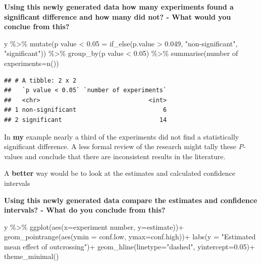 \documentclass[
]{book}
\newenvironment{Shaded}{\begin{snugshade}}{\end{snugshade}}
\newcommand{\AttributeTok}[1]{\textcolor[rgb]{0.77,0.63,0.00}{#1}}
\newcommand{\FloatTok}[1]{\textcolor[rgb]{0.00,0.00,0.81}{#1}}
\newcommand{\FunctionTok}[1]{\textcolor[rgb]{0.00,0.00,0.00}{#1}}
\newcommand{\NormalTok}[1]{#1}
\newcommand{\OtherTok}[1]{\textcolor[rgb]{0.56,0.35,0.01}{#1}}
\newcommand{\SpecialCharTok}[1]{\textcolor[rgb]{0.00,0.00,0.00}{#1}}
\newcommand{\StringTok}[1]{\textcolor[rgb]{0.31,0.60,0.02}{#1}}
\begin{document}
\textbf{Using this newly generated data how many experiments found a significant difference and how many did not? - What would you conclue from this?}

\begin{Shaded}
\begin{Highlighting}[]
\NormalTok{y }\SpecialCharTok{\%\textgreater{}\%} 
  \FunctionTok{mutate}\NormalTok{(}\StringTok{\textasciigrave{}}\AttributeTok{p value \textless{} 0.05}\StringTok{\textasciigrave{}} \OtherTok{=} \FunctionTok{if\_else}\NormalTok{(p.value }\SpecialCharTok{\textgreater{}} \FloatTok{0.049}\NormalTok{, }\StringTok{"non{-}significant"}\NormalTok{, }\StringTok{"significant"}\NormalTok{)) }\SpecialCharTok{\%\textgreater{}\%} 
  \FunctionTok{group\_by}\NormalTok{(}\StringTok{\textasciigrave{}}\AttributeTok{p value \textless{} 0.05}\StringTok{\textasciigrave{}}\NormalTok{) }\SpecialCharTok{\%\textgreater{}\%} 
  \FunctionTok{summarise}\NormalTok{(}\StringTok{\textasciigrave{}}\AttributeTok{number of experiments}\StringTok{\textasciigrave{}}\OtherTok{=}\FunctionTok{n}\NormalTok{())}
\end{Highlighting}
\end{Shaded}

\begin{verbatim}
## # A tibble: 2 x 2
##   `p value < 0.05` `number of experiments`
##   <chr>                              <int>
## 1 non-significant                        6
## 2 significant                           14
\end{verbatim}

In \textbf{my} example nearly a third of the experiments did not find a statistically significant difference. A less formal review of the research might tally these \emph{P}-values and conclude that there are inconsistent results in the literature.

A \textbf{better} way would be to look at the estimates and calculated confidence intervals

\textbf{Using this newly generated data compare the estimates and confidence intervals? - What do you conclude from this?}

\begin{Shaded}
\begin{Highlighting}[]
\NormalTok{y }\SpecialCharTok{\%\textgreater{}\%} 
  \FunctionTok{ggplot}\NormalTok{(}\FunctionTok{aes}\NormalTok{(}\AttributeTok{x=}\StringTok{\textasciigrave{}}\AttributeTok{experiment number}\StringTok{\textasciigrave{}}\NormalTok{, }\AttributeTok{y=}\NormalTok{estimate))}\SpecialCharTok{+}
  \FunctionTok{geom\_pointrange}\NormalTok{(}\FunctionTok{aes}\NormalTok{(}\AttributeTok{ymin =}\NormalTok{ conf.low, }\AttributeTok{ymax=}\NormalTok{conf.high))}\SpecialCharTok{+}
  \FunctionTok{labs}\NormalTok{(}\AttributeTok{y =} \StringTok{"Estimated mean effect of outcrossing"}\NormalTok{)}\SpecialCharTok{+}
  \FunctionTok{geom\_hline}\NormalTok{(}\AttributeTok{linetype=}\StringTok{"dashed"}\NormalTok{, }\AttributeTok{yintercept=}\FloatTok{0.05}\NormalTok{)}\SpecialCharTok{+}
  \FunctionTok{theme\_minimal}\NormalTok{()}
\end{Highlighting}
\end{Shaded}
\end{document}
